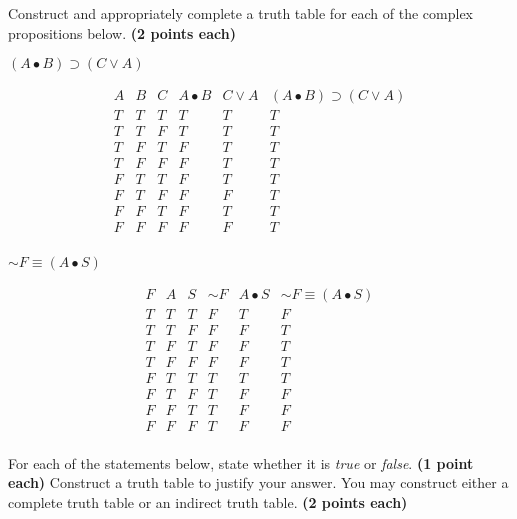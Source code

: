 \documentclass[10pt]{article}
\begin{document}
\begin{enumerate}
Construct and appropriately complete a truth table for each of the complex propositions below. \textbf{(2 points each)}

  \begin{multicols}{2}
  \item $(A \bullet B) \supset (C \vee A)$
  
  \[\begin{array}{cccccc}
     A & B & C & A \bullet B & C \vee A & (A \bullet B) \supset (C \vee A) \\ \hline
     T & T & T & T & T & T \\
     T & T & F & T & T & T \\
     T & F & T & F & T & T \\
     T & F & F & F & T & T \\
     F & T & T & F & T & T \\
     F & T & F & F & F & T \\
     F & F & T & F & T & T \\
     F & F & F & F & F & T \\
    \end{array}\]

  
  \item $\sim\! F \equiv (A \bullet S)$
  
    \[\begin{array}{cccccc}
     F & A & S & \sim\! F & A \bullet S & \sim\! F \equiv (A \bullet S) \\ \hline
     T & T & T & F & T & F \\
     T & T & F & F & F & T \\
     T & F & T & F & F & T \\
     T & F & F & F & F & T \\
     F & T & T & T & T & T \\
     F & T & F & T & F & F \\
     F & F & T & T & F & F \\
     F & F & F & T & F & F \\
    \end{array}\]
  
  \end{multicols}
  

For each of the statements below, state whether it is \textit{true} or \textit{false}. \textbf{(1 point each)} Construct a truth table to justify your answer.  You may construct either a complete truth table or an indirect truth table. \textbf{(2 points each)}


\end{enumerate}
\end{document}
